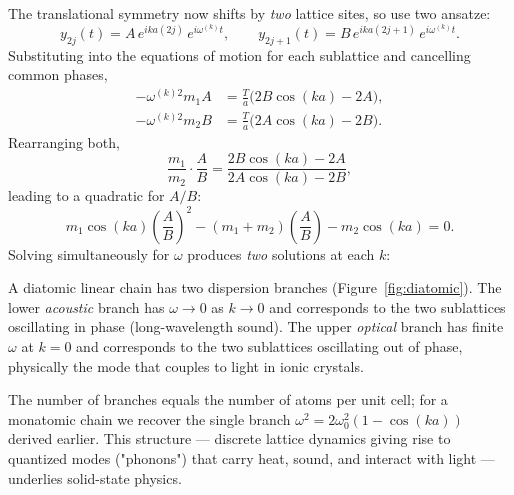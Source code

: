 The translational symmetry now shifts by \emph{two} lattice sites, so use two ansatze:
\begin{equation}
    y_{2j}(t) = A\, e^{i k a (2j)}\, e^{i\omega^{(k)} t},
    \qquad
    y_{2j+1}(t) = B\, e^{i k a (2j+1)}\, e^{i\omega^{(k)} t}.
\end{equation}
Substituting into the equations of motion for each sublattice and cancelling common phases,
\begin{align}
    -\omega^{(k)2} m_1 A &= \frac{T}{a}\bigl(2 B \cos(ka) - 2 A\bigr),\\
    -\omega^{(k)2} m_2 B &= \frac{T}{a}\bigl(2 A \cos(ka) - 2 B\bigr).
\end{align}
Rearranging both,
\begin{equation}
    \frac{m_1}{m_2}\cdot\frac{A}{B} = \frac{2B\cos(ka) - 2A}{2A\cos(ka) - 2B},
\end{equation}
leading to a quadratic for $A/B$:
\begin{equation}
    m_1 \cos(ka)\!\left(\frac{A}{B}\right)^2 - (m_1 + m_2)\!\left(\frac{A}{B}\right) - m_2 \cos(ka) = 0.
\end{equation}
Solving simultaneously for $\omega$ produces \emph{two} solutions at each $k$:

\begin{fact}
A diatomic linear chain has two dispersion branches (Figure~\ref{fig:diatomic}). The lower \emph{acoustic} branch has $\omega \to 0$ as $k \to 0$ and corresponds to the two sublattices oscillating in phase (long-wavelength sound). The upper \emph{optical} branch has finite $\omega$ at $k = 0$ and corresponds to the two sublattices oscillating out of phase, physically the mode that couples to light in ionic crystals.
\end{fact}

The number of branches equals the number of atoms per unit cell; for a monatomic chain we recover the single branch $\omega^2 = 2\omega_0^2(1 - \cos(ka))$ derived earlier. This structure --- discrete lattice dynamics giving rise to quantized modes ("phonons") that carry heat, sound, and interact with light --- underlies solid-state physics.

